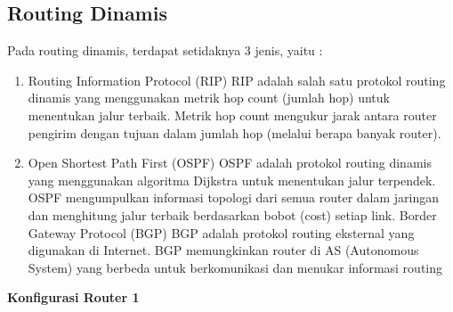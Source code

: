 \subsection{Routing Dinamis}
Pada routing dinamis, terdapat setidaknya 3 jenis, yaitu :
\begin{enumerate}
	\item Routing Information Protocol (RIP) RIP adalah salah satu protokol routing dinamis yang menggunakan metrik hop count (jumlah hop) untuk menentukan jalur terbaik. Metrik hop count mengukur jarak antara router pengirim dengan tujuan dalam jumlah hop (melalui berapa banyak router).
	\item Open Shortest Path First (OSPF) OSPF adalah protokol routing dinamis yang menggunakan
	algoritma Dijkstra untuk menentukan jalur terpendek. OSPF mengumpulkan informasi topologi
	dari semua router dalam jaringan dan menghitung jalur terbaik berdasarkan bobot (cost) setiap
	link.
	Border Gateway Protocol (BGP) BGP adalah protokol routing eksternal yang digunakan di Internet. BGP memungkinkan router di AS (Autonomous System) yang berbeda untuk berkomunikasi dan menukar informasi routing
\end{enumerate}

\begin{center} 
	\textbf{Konfigurasi Router 1}
\end{center}

